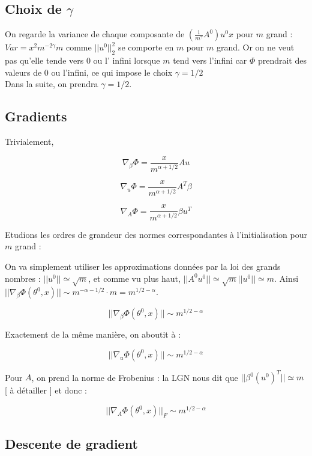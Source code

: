 \documentclass[a4paper, 11pt, french]{article}
\newcommand{\ch}[1]{{\color{blue} [ #1 ]}}
\begin{document}
	\subsection{Choix de $\gamma$}
	
	On regarde la variance de chaque composante de 
	$ \left(\frac{1}{m^{\gamma}} A^0 \right) u^0 x $ pour $m$ grand : 
	$ Var = x^2 m^{-2\gamma} m $ comme $|| u^0 ||_2^2$ se comporte en $m$ pour $m$ grand. Or on ne veut pas qu'elle tende vers 0 ou l' infini lorsque $m$ tend vers l'infini car $\Phi$ prendrait des valeurs de 0 ou l'infini, ce qui impose le choix $\gamma = 1/2$ \\
	
	Dans la suite, on prendra $\gamma = 1/2$.

	\subsection{Gradients}
	
	Trivialement,
	
	\[\nabla_{\beta} \Phi = \frac{x}{m^{\alpha + 1/2}} A u\]
	
	\[\nabla_u \Phi = \frac{x}{m^{\alpha + 1/2}} A^T \beta\]

	\[\nabla_A \Phi = \frac{x}{m^{\alpha + 1/2}} \beta u^T\]
	
	Etudions les ordres de grandeur des normes correspondantes à l'initialisation pour $m$ grand :
	
	On va simplement utiliser les approximations données par la loi des grands nombres :
	 $||u^0|| \simeq \sqrt{m}$, et comme vu plus haut, 
	 $||A^0 u^0|| \simeq \sqrt{m}||u^0|| \simeq m$. Ainsi $||\nabla_{\beta} \Phi (\theta^0, x)|| \sim m^{-\alpha - 1/2} \cdot m = m^{1/2 - \alpha}$.
	 
	 \[||\nabla_{\beta} \Phi (\theta^0, x)|| \sim m^{1/2 - \alpha}\]
	 
	 Exactement de la même manière, on aboutit à :
	 
	 \[||\nabla_u \Phi (\theta^0, x)|| \sim m^{1/2 - \alpha}\]
	 
	 Pour $A$, on prend la norme de Frobenius : la LGN nous dit que $||\beta^0 (u^0)^T|| \simeq m$ \ch{\`a d\'etailler} et donc :
	 
	 \[||\nabla_A \Phi (\theta^0, x)||_F \sim m^{1/2 - \alpha}\]
	 
	 \subsection{Descente de gradient}
	 
\end{document}
